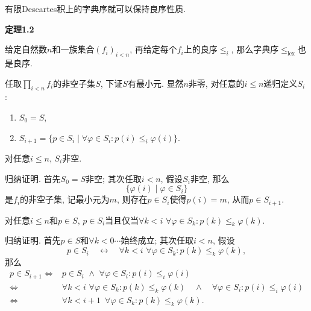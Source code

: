 \documentclass[UTF8]{ctexart}
\begin{document}
\newpage

有限Descartes积上的字典序就可以保持良序性质.

\vspace{10pt}

\hypertarget{sec:定理1.2}{}
\noindent\textbf{定理1.2}

给定自然数$n$和一族集合$(f_i)_{i<n}$,
再给定每个$f_i$上的良序$\leqslant_i$, 那么字典序$\leqslant_{\mathrm{lex}}$也是良序.


任取$\displaystyle\prod_{i<n}f_i$的非空子集$S$, 下证$S$有最小元.
显然$n$非零, 对任意的$i\leqslant n$递归定义$S_i$ :
\vspace{6pt}
\begin{enumerate}
    \item $S_0=S$,
    \item $S_{i+1}=\{p\in S_i\mid\forall\varphi\in S_i:p(i)\leqslant_i\varphi(i)\}$.
\end{enumerate}

\vspace{5pt}\hspace{-1em}{\kaishu 命题1.} 对任意$i\leqslant n$, $S_i$非空.

\vspace{3pt}
归纳证明. 首先$S_0=S$非空; 其次任取$i<n$, 假设$S_i$非空, 那么
\[
    \{\varphi(i)\mid\varphi\in S_i\}
\]
是$f_i$的非空子集, 记最小元为$m$, 则存在$p\in S_i$使得$p(i)=m$, 从而$p\in S_{i+1}$.

\vspace{5pt}\hspace{-1em}{\kaishu 命题2.}
对任意$i\leqslant n$和$p\in S$,
$p\in S_i$当且仅当$\forall k<i\,\,\forall\varphi\in S_k:p(k)\leqslant_k\varphi(k)$.

\vspace{3pt}
归纳证明. 首先$p\in S$和$\forall k<0\cdots$始终成立; 其次任取$i<n$, 假设
\[
    p\in S_i\quad\leftrightarrow\quad
    \forall k<i\,\,\forall\varphi\in S_k:p(k)\leqslant_k\varphi(k),
\]
那么
\[\begin{aligned}
    p\in S_{i+1}
    \iff&p\in S_i\,\,\land\,\,\forall\varphi\in S_i:p(i)\leqslant_i\varphi(i)\\[-3pt]
    \iff&\forall k<i\,\,\forall\varphi\in S_k:p(k)\leqslant_k\varphi(k)
    \quad\land\quad\forall\varphi\in S_i:p(i)\leqslant_i\varphi(i)\\[-3pt]
    \iff&\forall k<i+1\,\,\,\forall\varphi\in S_k:p(k)\leqslant_k\varphi(k).
\end{aligned}\]
\end{document}
